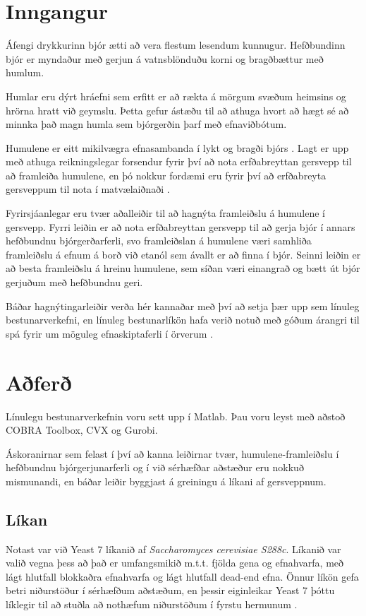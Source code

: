\documentclass[11pt]{article}
\begin{document}
\vspace{1cm}
\begin{multicols}{2}

\section{Inngangur}
Áfengi drykkurinn bjór ætti að vera flestum lesendum kunnugur. Hefðbundinn bjór er myndaður með gerjun á vatnsblönduðu korni og bragðbættur með humlum.

Humlar eru dýrt hráefni \cite{brewis} sem erfitt er að rækta á mörgum svæðum heimsins og hrörna hratt við geymslu. Þetta gefur ástæðu til að athuga hvort að hægt sé að minnka það magn humla sem bjórgerðin þarf með efnaviðbótum.

Humulene\cite[KEGG: C09684]{Kanehisa01012000} er eitt mikilvægra efnasambanda í lykt og bragði bjórs \cite{howard1957evaluation}. Lagt er upp með athuga reikningslegar forsendur fyrir því að nota erfðabreyttan gersvepp til að framleiða humulene, en þó nokkur fordæmi eru fyrir því að erfðabreyta gersveppum til nota í matvælaiðnaði \cite{dequin2001potential}.

Fyrirsjáanlegar eru tvær aðalleiðir til að hagnýta framleiðslu á humulene í gersvepp. Fyrri leiðin er að nota erfðabreyttan gersvepp til að gerja bjór í annars hefðbundnu bjórgerðarferli, svo framleiðslan á humulene væri samhliða framleiðslu á efnum á borð við etanól sem ávallt er að finna í bjór. Seinni leiðin er að besta framleiðslu á hreinu humulene, sem síðan væri einangrað og bætt út bjór gerjuðum með hefðbundnu geri.

Báðar hagnýtingarleiðir verða hér kannaðar með því að setja þær upp sem línuleg bestunarverkefni, en línuleg bestunarlíkön hafa verið notuð með góðum árangri til spá fyrir um möguleg efnaskiptaferli í örverum \cite{banga2008optimization,edwards2001silico}.
\section{Aðferð}
Línulegu bestunarverkefnin voru sett upp í Matlab. Þau voru leyst með aðstoð COBRA Toolbox, CVX og Gurobi.

Áskoranirnar sem felast í því að kanna leiðirnar tvær, humulene-framleiðslu í hefðbundnu bjórgerjunarferli og í við sérhæfðar aðstæður eru nokkuð mismunandi, en báðar leiðir byggjast á greiningu á líkani af gersveppnum.
\subsection{Líkan}
Notast var við Yeast 7 líkanið \cite{yeastsf} af \emph{Saccharomyces cerevisiae S288c}. Líkanið var valið vegna þess að það er umfangsmikið m.t.t. fjölda gena og efnahvarfa, með lágt hlutfall blokkaðra efnahvarfa og lágt hlutfall dead-end efna. Önnur líkön gefa betri niðurstöður í sérhæfðum aðstæðum, en þessir eiginleikar Yeast 7 þóttu líklegir til að stuðla að nothæfum niðurstöðum í fyrstu hermunum \cite{heavner2015comparative}. 

\end{multicols}
\end{document}
